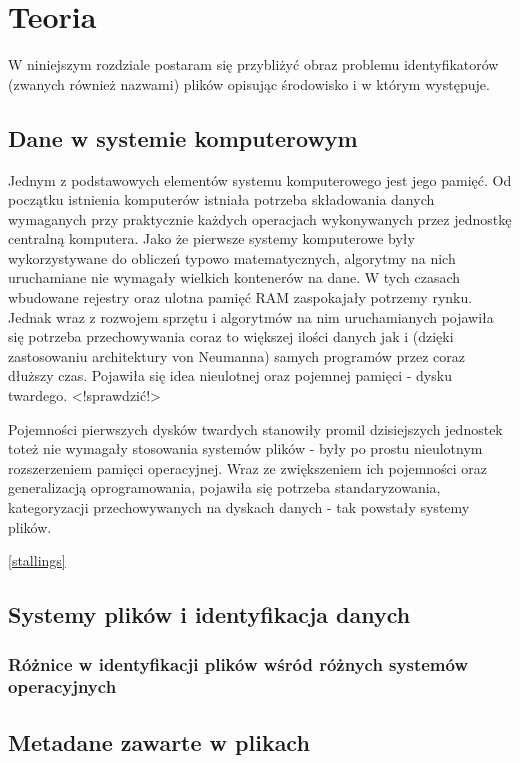 \chapter{Teoria}
W niniejszym rozdziale postaram się przybliżyć obraz problemu identyfikatorów (zwanych również nazwami) plików opisując środowisko i w którym występuje.

\section{Dane w systemie komputerowym}
\par
Jednym z podstawowych elementów systemu komputerowego jest jego pamięć. Od początku istnienia komputerów istniała potrzeba składowania danych wymaganych przy praktycznie każdych operacjach wykonywanych przez jednostkę centralną komputera. Jako że pierwsze systemy komputerowe były wykorzystywane do obliczeń typowo matematycznych, algorytmy na nich uruchamiane nie wymagały wielkich kontenerów na dane. W tych czasach wbudowane rejestry oraz ulotna pamięć RAM zaspokajały potrzemy rynku. Jednak wraz z rozwojem sprzętu i algorytmów na nim uruchamianych pojawiła się potrzeba przechowywania coraz to większej ilości danych jak i (dzięki zastosowaniu architektury von Neumanna) samych programów przez coraz dłuższy czas. Pojawiła się idea nieulotnej oraz pojemnej pamięci - dysku twardego. <!sprawdzić!>

\par
Pojemności pierwszych dysków twardych stanowiły promil dzisiejszych jednostek toteż nie wymagały stosowania systemów plików - były po prostu nieulotnym rozszerzeniem pamięci operacyjnej. Wraz ze zwiększeniem ich pojemności oraz generalizacją oprogramowania, pojawiła się potrzeba standaryzowania, kategoryzacji przechowywanych na dyskach danych - tak powstały systemy plików.

\ref{stallings}

\section{Systemy plików i identyfikacja danych}

\subsection{Różnice w identyfikacji plików wśród różnych systemów operacyjnych}

\section{Metadane zawarte w plikach}

\clearpage
